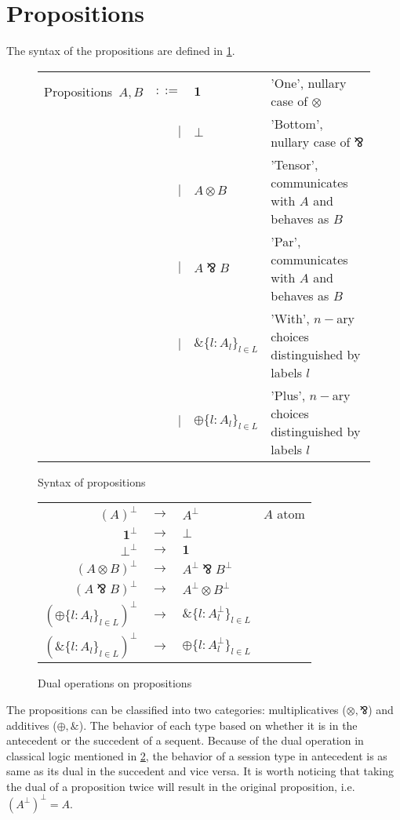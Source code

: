\documentclass[12pt, openany]{memoir}
\newcommand*{\pare}[0]{\mathbin{\bindnasrepma}}
\begin{document}
\section{Propositions} \label{sec:propsyntax}
The syntax of the propositions are defined in \cref{fig:propositions}.
\begin{figure}[H]
  \centering
  \begin{tabular}{c r l l}
    Propositions\ $A, B$ & $::=$ & $\textbf{1}$ & 'One', nullary case of $\otimes$ \\ 
    & $\mid$ & $\boldsymbol{\bot}$ & 'Bottom', nullary case of $\pare$  \\
    & $\mid$ & $A \otimes B$ & 'Tensor', communicates with $A$ and behaves as $B$  \\  
    & $\mid$ & $A \pare B$ & 'Par', communicates with $A$ and behaves as $B$ \\    
    & $\mid$ & $\& \{l : A_l\}_{l \in L}$ & 'With', $n-$ary choices distinguished by labels $l$ \\
    & $\mid$ & $\oplus \{l : A_l\}_{l \in L}$ & 'Plus', $n-$ary choices distinguished by labels $l$ 
   \end{tabular}
  \caption{Syntax of propositions}
  \label{fig:propositions}
\end{figure}
\begin{figure}[H]
  \centering
  \begin{tabular}{r c l l}
    $(A)^\bot$ & $\longrightarrow$ & $A^\bot$ & $A$ atom \\ 
    $\textbf{1}^\bot$ & $\longrightarrow$ & $\boldsymbol{\bot}$ & \\
    $\boldsymbol{\bot} ^ \bot$ & $\longrightarrow$ & $\textbf{1}$ & \\
    $(A \otimes B)^\bot$ & $\longrightarrow$ & $A^\bot\pare B^\bot$ &  \\  
    $(A \pare B)^\bot$ & $\longrightarrow$ & $A^\bot \otimes B^\bot$ & \\    
    $(\oplus\{l : A_l\}_{l \in L})^\bot$ & $\longrightarrow$ & $\& \{l : A_l^\bot\}_{l \in L}$ & \\ 
    $(\&\{l : A_l\}_{l \in L})^\bot$ & $\longrightarrow$ & $\oplus \{l : A_l^\bot\}_{l \in L}$ & \\
   \end{tabular}
  \caption{Dual operations on propositions}
  \label{fig:dual}
\end{figure}
The propositions can be classified into two categories: multiplicatives ($\otimes, \pare$) and additives ($\oplus, \&$).
The behavior of each type based on whether it is in the antecedent or the succedent of a sequent.
Because of the dual operation in classical logic mentioned in \cref{fig:dual}, the behavior of a session type in antecedent is as same as its dual in the succedent and vice versa.
It is worth noticing that taking the dual of a proposition twice will result in the original proposition, i.e. ${(A^\bot)}^\bot = A$.
\end{document}
